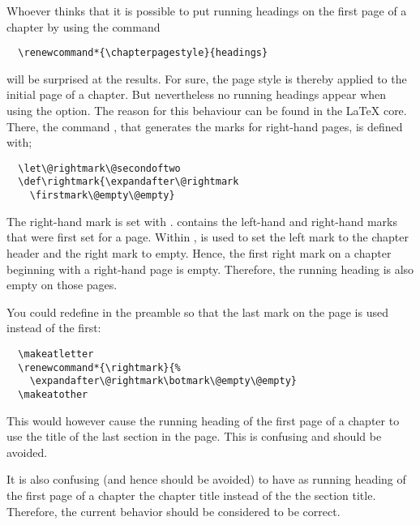 \begin{Explain}
  Whoever thinks that it is possible to put running headings on the
  first page of a chapter by using the command
\begin{lstlisting}
  \renewcommand*{\chapterpagestyle}{headings}
\end{lstlisting}
  will be surprised at the results.
  For sure, the page style  is thereby applied to the
  initial page of a chapter. But nevertheless no running headings appear
  when using the  option.
  The reason for this behaviour can be found in the \LaTeX{}
  core. There, the command , that generates the marks
  for right-hand pages, is defined with;
\begin{lstlisting}
  \let\@rightmark\@secondoftwo
  \def\rightmark{\expandafter\@rightmark
    \firstmark\@empty\@empty}
\end{lstlisting}
  The right-hand mark is set with . 
  contains the  left-hand  and right-hand  marks that were first set
  for a page. Within ,  is used to set
  the left mark to the chapter header and the right mark to empty.
  Hence, the first right
  mark on  a chapter beginning with a right-hand page is empty. Therefore,
  the running heading is also empty on those pages.

  You could redefine  in the preamble so that the
  last mark on the page is used instead of the first:
\begin{lstlisting}
  \makeatletter
  \renewcommand*{\rightmark}{%
    \expandafter\@rightmark\botmark\@empty\@empty}
  \makeatother
\end{lstlisting}
  This would however cause the running heading of the first page of a
  chapter to use the title of the last section in the page. This is
  confusing and should be avoided.

  It is also confusing (and hence should be avoided) to have as
  running heading of the first page of a chapter the chapter title
  instead of the the section title. Therefore, the current behavior
  should be considered to be correct.
\end{Explain}
%
%
%
%
%


